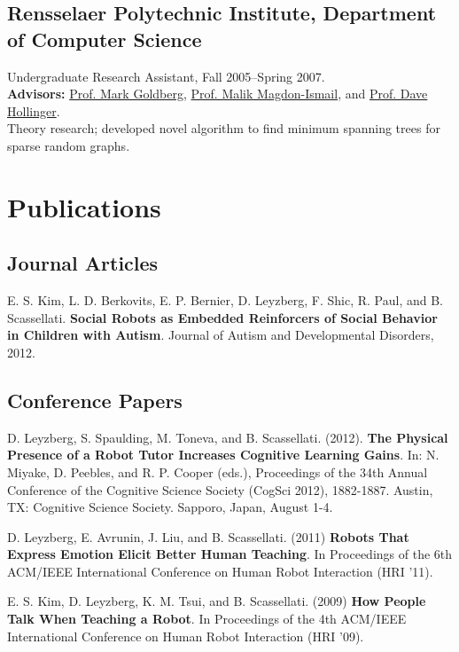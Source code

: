 \documentclass[10pt,letterpaper]{article}
\renewenvironment{itemize}{
  \begin{list}{}{
    \setlength{\leftmargin}{1.5em}
    \setlength{\itemsep}{0.25em}
    \setlength{\parskip}{0pt}
    \setlength{\parsep}{0.25em}
  }
}{
  \end{list}
}
\begin{document}
\subsection*{Rensselaer Polytechnic Institute, Department of Computer Science}
\begin{itemize}
\item Undergraduate Research Assistant, Fall 2005--Spring 2007. \\
\textbf{Advisors:} \href{http://www.cs.rpi.edu/~goldberg/}{Prof. Mark Goldberg}, \href{http://www.cs.rpi.edu/~magdon/}{Prof. Malik Magdon-Ismail}, and \href{http://www.cs.rpi.edu/~hollingd}{Prof. Dave Hollinger}. \\
Theory research; developed novel algorithm to find minimum spanning trees for sparse random graphs.
\end{itemize}


\section*{Publications}
\subsection*{Journal Articles}
\begin{itemize}
\item E. S. Kim, L. D. Berkovits, E. P. Bernier, D. Leyzberg, F. Shic, R. Paul, and B. Scassellati. {\bf Social Robots as Embedded Reinforcers of Social Behavior in Children with Autism}. Journal of Autism and Developmental Disorders, 2012.
\end{itemize}

\subsection*{Conference Papers}
\begin{itemize}
\item D. Leyzberg, S. Spaulding, M. Toneva, and B. Scassellati. (2012). {\bf The Physical Presence of a Robot Tutor Increases Cognitive Learning Gains}. In: N. Miyake, D. Peebles, and R. P. Cooper (eds.), Proceedings of the 34th Annual Conference of the Cognitive Science Society (CogSci 2012), 1882-1887. Austin, TX: Cognitive Science Society. Sapporo, Japan, August 1-4.
\item D. Leyzberg, E. Avrunin, J. Liu, and B. Scassellati. (2011) {\bf Robots That Express Emotion Elicit Better Human Teaching}. In Proceedings of the 6th ACM/IEEE International Conference on Human Robot Interaction (HRI '11).
\item E. S. Kim, D. Leyzberg, K. M. Tsui, and B. Scassellati. (2009) {\bf How People Talk When Teaching a Robot}. In Proceedings of the 4th ACM/IEEE International Conference on Human Robot Interaction (HRI '09).
\end{itemize}
\end{document}
